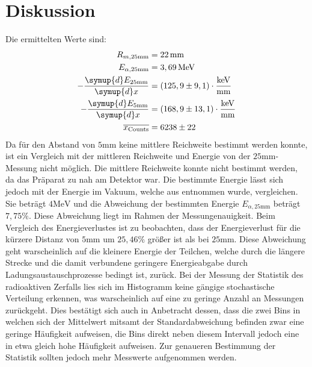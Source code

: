 \section{Diskussion}
\label{sec:Diskussion}
Die ermittelten Werte sind:
\begin{align*}
  R_{m,25 \si{\milli\metre}} &= 22 \, \si{\milli\metre} \\
  E_{\alpha , 25 \si{\milli\metre}} &= 3,69 \, \si{\mega\electronvolt} \\
  - \frac{\symup{d} E_{25 \si{\milli\metre}}}{\symup{d}x} &= (125,9 \pm 9,1) \cdot \si{\kilo\electronvolt\per\milli\metre} \\
  - \frac{\symup{d} E_{5 \si{\milli\metre}}}{\symup{d}x} &= (168,9 \pm 13,1) \cdot \si{\kilo\electronvolt\per\milli\metre} \\
  \overline{x_{\text{Counts}}} &= 6238 \pm 22
\end{align*}
Da für den Abstand von $5 \si{\milli\metre}$ keine mittlere Reichweite bestimmt werden konnte, ist ein Vergleich mit der mittleren Reichweite und Energie von der
$25 \si{\milli\metre}$-Messung nicht möglich. Die mittlere Reichweite konnte nicht bestimmt werden, da das Präparat zu nah am Detektor war.
Die bestimmte Energie lässt sich jedoch mit der Energie im Vakuum, welche aus \cite{1} entnommen wurde, vergleichen.
Sie beträgt $4 \si{\mega\electronvolt}$ und die Abweichung der bestimmten Energie $ E_{\alpha , 25 \si{\milli\metre}} $ beträgt $7,75 \%$.
Diese Abweichung liegt im Rahmen der Messungenauigkeit.
Beim Vergleich des Energieverlustes ist zu beobachten, dass der Energieverlust für die kürzere Distanz von $5 \si{\milli\metre}$ um $25,46 \%$ größer ist als
bei $25 \si{\milli\metre}$. Diese Abweichung geht warscheinlich auf die kleinere Energie der Teilchen, welche durch die längere Strecke und die damit verbundene geringere
Energieabgabe durch Ladungsaustauschprozesse bedingt ist, zurück. Bei der Messung der Statistik des radioaktiven Zerfalls lies sich im Histogramm keine gängige stochastische
Verteilung erkennen, was warscheinlich auf eine zu geringe Anzahl an Messungen zurückgeht. Dies bestätigt sich auch in Anbetracht dessen, dass die zwei Bins in welchen
sich der Mittelwert mitsamt der Standardabweichung befinden zwar eine geringe Häufigkeit aufweisen, die Bins direkt neben diesem Intervall jedoch eine in etwa gleich hohe
Häufigkeit aufweisen. Zur genaueren Bestimmung der Statistik sollten jedoch mehr Messwerte aufgenommen werden.
